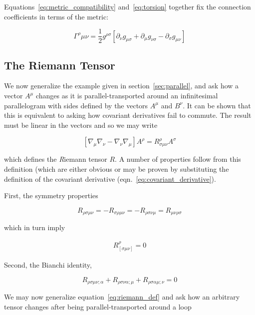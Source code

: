 Equations~\ref{eq:metric_compatibility} and~\ref{eq:torsion} together
fix the connection coefficients in terms of the metric:

\begin{equation}
\Gamma^{\rho}{\mu\nu}
= \frac{1}{2} g^{\rho\sigma}\left[
\partial_\nu g_{\mu\sigma}
+ \partial_\mu g_{\nu\sigma}
- \partial_\sigma g_{\mu\nu}
\right]
\end{equation}


\subsection{The Riemann Tensor}

We now generalize the example given in section~\ref{sec:parallel},
and ask how a vector $A^\mu$ changes as it is parallel-transported
around an infinitesimal parallelogram with sides defined by the
vectors $A^\mu$ and $B^\nu$.  It can be shown that this is equivalent
to asking how covariant derivatives fail to commute.  The result must
be linear in the vectors and so we may write

\begin{equation}
\label{eq:riemann_def}
\left[\nabla_\mu \nabla_\nu - \nabla_\nu \nabla_\mu\right] A^\rho
= R^\rho_{\sigma\mu\nu} A^\sigma
\end{equation}

which defines the {\emph Riemann tensor} $R$.  A number of properties
follow from this definition (which are either obvious or may be proven
by substituting the definition of the covariant derivative
(eqn.~\ref{eq:covariant_derivative}).

First, the symmetry properties

\begin{equation}
\label{eq:symmetries}
R_{\rho\sigma\mu\nu}
= -R_{\sigma\rho\mu\nu}
= -R_{\rho\sigma\nu\mu}
= R_{\mu\nu\rho\sigma}
\end{equation}

which in turn imply

\begin{align}
R^\rho_{[\sigma\mu\nu]} = 0
\end{align}

Second, the Bianchi identity,

\begin{equation}
\label{eq:bianchi}
R_{\rho\sigma\mu\nu;\alpha}
+R_{\rho\sigma\nu\alpha;\mu}
+R_{\rho\sigma\alpha\mu;\nu} = 0
\end{equation}

We may now generalize equation~\ref{eq:riemann_def} and ask how an
arbitrary tensor changes after being parallel-transported 
around a loop

